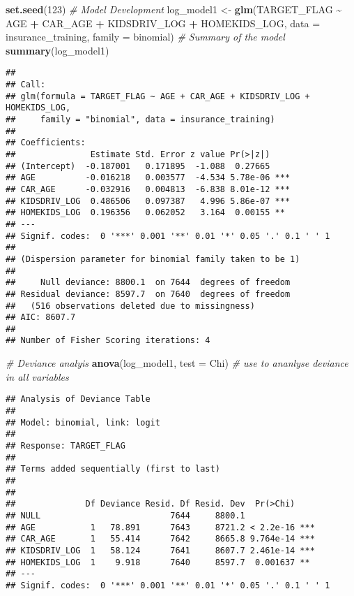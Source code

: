 \documentclass[
]{article}
\newenvironment{Shaded}{\begin{snugshade}}{\end{snugshade}}
\newcommand{\AttributeTok}[1]{\textcolor[rgb]{0.13,0.29,0.53}{#1}}
\newcommand{\CommentTok}[1]{\textcolor[rgb]{0.56,0.35,0.01}{\textit{#1}}}
\newcommand{\DecValTok}[1]{\textcolor[rgb]{0.00,0.00,0.81}{#1}}
\newcommand{\FunctionTok}[1]{\textcolor[rgb]{0.13,0.29,0.53}{\textbf{#1}}}
\newcommand{\NormalTok}[1]{#1}
\newcommand{\OtherTok}[1]{\textcolor[rgb]{0.56,0.35,0.01}{#1}}
\newcommand{\SpecialCharTok}[1]{\textcolor[rgb]{0.81,0.36,0.00}{\textbf{#1}}}
\newcommand{\StringTok}[1]{\textcolor[rgb]{0.31,0.60,0.02}{#1}}
\begin{document}
\begin{Shaded}
\begin{Highlighting}[]
\FunctionTok{set.seed}\NormalTok{(}\DecValTok{123}\NormalTok{)}
\CommentTok{\# Model Development}
\NormalTok{log\_model1 }\OtherTok{\textless{}{-}} \FunctionTok{glm}\NormalTok{(TARGET\_FLAG }\SpecialCharTok{\textasciitilde{}}\NormalTok{ AGE }\SpecialCharTok{+}\NormalTok{ CAR\_AGE }\SpecialCharTok{+}\NormalTok{ KIDSDRIV\_LOG }\SpecialCharTok{+}\NormalTok{ HOMEKIDS\_LOG, }\AttributeTok{data =}\NormalTok{ insurance\_training, }\AttributeTok{family =} \StringTok{\textquotesingle{}binomial\textquotesingle{}}\NormalTok{)}
\CommentTok{\# Summary of the model }
\FunctionTok{summary}\NormalTok{(log\_model1)}
\end{Highlighting}
\end{Shaded}

\begin{verbatim}
## 
## Call:
## glm(formula = TARGET_FLAG ~ AGE + CAR_AGE + KIDSDRIV_LOG + HOMEKIDS_LOG, 
##     family = "binomial", data = insurance_training)
## 
## Coefficients:
##               Estimate Std. Error z value Pr(>|z|)    
## (Intercept)  -0.187001   0.171895  -1.088  0.27665    
## AGE          -0.016218   0.003577  -4.534 5.78e-06 ***
## CAR_AGE      -0.032916   0.004813  -6.838 8.01e-12 ***
## KIDSDRIV_LOG  0.486506   0.097387   4.996 5.86e-07 ***
## HOMEKIDS_LOG  0.196356   0.062052   3.164  0.00155 ** 
## ---
## Signif. codes:  0 '***' 0.001 '**' 0.01 '*' 0.05 '.' 0.1 ' ' 1
## 
## (Dispersion parameter for binomial family taken to be 1)
## 
##     Null deviance: 8800.1  on 7644  degrees of freedom
## Residual deviance: 8597.7  on 7640  degrees of freedom
##   (516 observations deleted due to missingness)
## AIC: 8607.7
## 
## Number of Fisher Scoring iterations: 4
\end{verbatim}

\begin{Shaded}
\begin{Highlighting}[]
\CommentTok{\# Deviance analyis }
\FunctionTok{anova}\NormalTok{(log\_model1, }\AttributeTok{test =} \StringTok{\textquotesingle{}Chi\textquotesingle{}}\NormalTok{) }\CommentTok{\# use to ananlyse deviance in all variables }
\end{Highlighting}
\end{Shaded}

\begin{verbatim}
## Analysis of Deviance Table
## 
## Model: binomial, link: logit
## 
## Response: TARGET_FLAG
## 
## Terms added sequentially (first to last)
## 
## 
##              Df Deviance Resid. Df Resid. Dev  Pr(>Chi)    
## NULL                          7644     8800.1              
## AGE           1   78.891      7643     8721.2 < 2.2e-16 ***
## CAR_AGE       1   55.414      7642     8665.8 9.764e-14 ***
## KIDSDRIV_LOG  1   58.124      7641     8607.7 2.461e-14 ***
## HOMEKIDS_LOG  1    9.918      7640     8597.7  0.001637 ** 
## ---
## Signif. codes:  0 '***' 0.001 '**' 0.01 '*' 0.05 '.' 0.1 ' ' 1
\end{verbatim}
\end{document}

